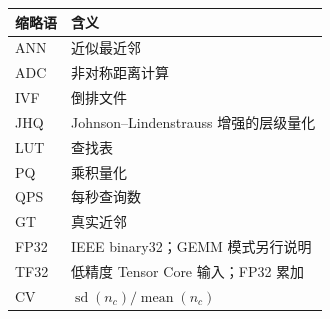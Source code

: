 \bigskip
\begin{longtable}{@{}>{\raggedright\arraybackslash}p{.25\linewidth}>{\raggedright\arraybackslash}p{.70\linewidth}@{}}
\toprule
缩略语 & 含义 \\
\midrule
ANN & 近似最近邻 \\
ADC & 非对称距离计算 \\
IVF & 倒排文件 \\
JHQ & Johnson--Lindenstrauss 增强的层级量化 \\
LUT & 查找表 \\
PQ & 乘积量化 \\
QPS & 每秒查询数 \\
GT & 真实近邻 \\
FP32 & IEEE binary32；GEMM 模式另行说明 \\
TF32 & 低精度 Tensor Core 输入；FP32 累加 \\
CV & $\operatorname{sd}(n_c)/\operatorname{mean}(n_c)$ \\
\bottomrule
\end{longtable}
\endgroup
